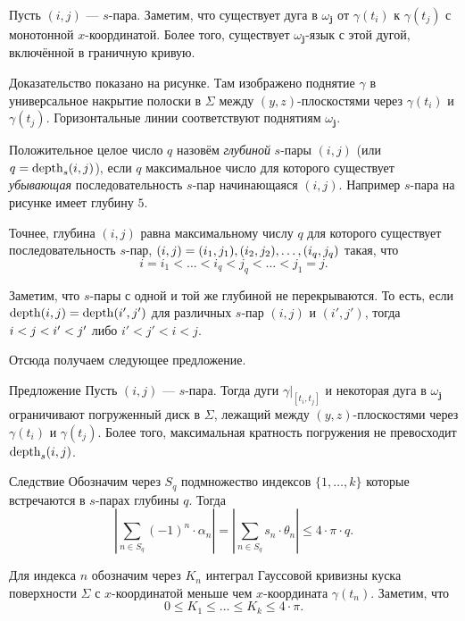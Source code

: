 \documentclass[a4paper,10pt]{article}
\begin{document}
Пусть $(i,j)$ --- $s$-пара.
Заметим, что существует дуга в $\omega_{\bm{j}}$ от $\gamma(t_i)$ к $\gamma(t_j)$
с монотонной $x$-координатой.
Более того, существует $\omega_{\bm{j}}$-язык с этой дугой, включённой в граничную кривую.

Доказательство показано на рисунке.
Там изображено поднятие $\gamma$ в универсальное накрытие полоски в $\Sigma$ между $(y,z)$-плоскостями через $\gamma(t_i)$ и $\gamma(t_j)$.
Горизонтальные линии соответствуют поднятиям $\omega_{\bm{j}}$.

Положительное целое число $q$
назовём \emph{глубиной} $s$-пары $(i,j)$ 
(или $q\zz=\depth_{s}(i,j)$), 
если $q$ максимальное число для которого существует \emph{убывающая} последовательность $s$-пар начинающаяся $(i,j)$.
Например $s$-пара на рисунке имеет глубину $5$.

Точнее, глубина $(i,j)$ равна максимальному числу $q$
для которого существует последовательность $s$-пар,
$(i,j)=(i_1,j_1),(i_2,j_2),\zz\dots,(i_q,j_q)$ такая, что
\[i=i_1<\dots<i_q<j_q<\dots<j_1=j.\]


Заметим, что $s$-пары с одной и той же глубиной не перекрываются.
То есть, если $\mathop{\rm depth}\nolimits(i,j)=\mathop{\rm depth}\nolimits(i',j')$
для различных $s$-пар $(i,j)$ и $(i',j')$,
тогда $i\zz<j\zz<i'\zz<j'$ либо $i'<j'<i<j$.

Отсюда получаем следующее предложение.

\begin{thm}{Предложение}\label{prop:immersion}
Пусть $(i,j)$ --- $s$-пара.
Тогда дуги $\gamma|_{[t_i,t_j]}$ и некоторая дуга в $\omega_{\bm{j}}$ ограничивают погруженный диск в $\Sigma$, лежащий между $(y,z)$-плоскостями через $\gamma(t_i)$ и $\gamma(t_j)$.
Более того, максимальная кратность погружения не превосходит $\mathop{\rm depth}\nolimits_{s}(i,j)$.
\end{thm}


\begin{thm}{Следствие}\label{cor:Sq}
Обозначим через $S_q$ подмножество индексов $\{1,\dots,k\}$
которые встречаются в $s$-парах глубины $q$.
Тогда
\[\left|\sum_{n\in S_q}(-1)^n\cdot\alpha_n\right|
=\left|\sum_{n\in S_q}s_n\cdot\theta_n\right|
\le 4\cdot\pi\cdot q.\]
\end{thm}

 Для индекса $n$ обозначим через $K_n$ интеграл Гауссовой кривизны куска поверхности $\Sigma$ с $x$-координатой меньше чем $x$-координата $\gamma(t_n)$.
Заметим, что
\[0\le K_1\le\dots\le K_k\le 4\cdot\pi.\]
\end{document}
